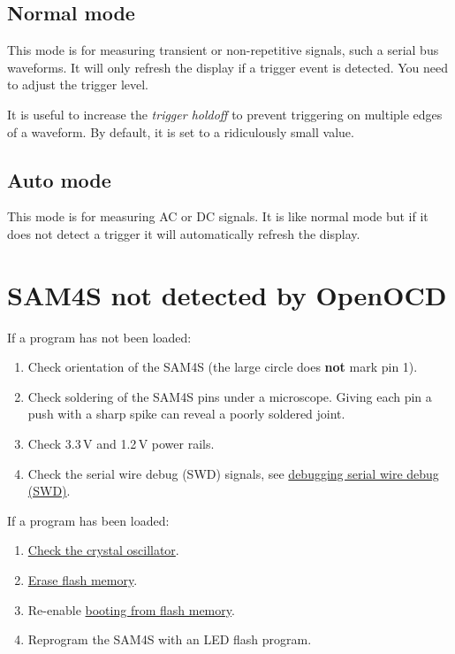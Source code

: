 \subsection{Normal mode}
\label{normal-mode}

This mode is for measuring transient or non-repetitive signals, such a
serial bus waveforms. It will only refresh the display if a trigger
event is detected.  You need to adjust the trigger level.

It is useful to increase the \emph{trigger holdoff} to prevent
triggering on multiple edges of a waveform.  By default, it is set to
a ridiculously small value.

\subsection{Auto mode}
\label{auto-mode}

This mode is for measuring AC or DC signals. It is like normal mode
but if it does not detect a trigger it will automatically refresh the
display.

\section{SAM4S not detected by OpenOCD}
\label{sam4s-not-detected-by-openocd}

If a program has not been loaded:

\begin{enumerate}
\item
  Check orientation of the SAM4S (the large circle does \textbf{not}
  mark pin 1).
\item
  Check soldering of the SAM4S pins under a microscope. Giving
  each pin a push with a sharp spike can reveal a poorly soldered joint.
\item
  Check 3.3\,V and 1.2\,V power rails.
\item
  Check the serial wire debug (SWD) signals, see
  \protect\hyperref[debugging]{debugging serial wire debug (SWD)}.
\end{enumerate}

If a program has been loaded:

\begin{enumerate}
\item  \protect\hyperref[checking-the-crystal-oscillator]{Check the
    crystal oscillator}.

\item \hyperref[erasing-flash-memory]{Erase flash memory}.

\item Re-enable \hyperref[booting-from-flash-memory]{booting from flash
  memory}.

\item  Reprogram the SAM4S with an LED flash program.
\end{enumerate}


